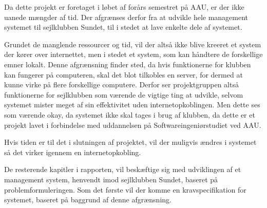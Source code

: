 Da dette projekt er foretaget i løbet af forårs semestret på AAU, er der ikke uanede mængder af tid. Der
afgrænses derfor fra at udvikle hele management systemet til sejlklubben Sundet, til i stedet at lave enkelte
dele af systemet.

Grundet de manglende ressourcer og tid, vil der altså ikke blive kreeret et system der kører over internettet,
men i stedet et system, som kan håndtere de forskellige emner lokalt. Denne afgrænsning finder sted, da hvis
funktionerne for klubben kan fungerer på computeren, skal det blot tilkobles en server, for dermed at kunne
virke på flere forskellige computere. Derfor ser projektgruppen altså funktionerne for sejlklubben som værende
de vigtige ting at udvikle, selvom systemet mister meget af sin effektivitet uden internetopkoblingen. Men
dette ses som værende okay, da systemet ikke skal tages i brug af klubben, da dette er et projekt lavet i
forbindelse med uddannelsen på Softwareingeniørstudiet ved AAU.

Hvis tiden er til det i slutningen af projektet, vil der muligvis ændres i systemet så det virker igennem en
internetopkobling.

De resterende kapitler i rapporten, vil beskæftige sig med udviklingen af et management system, henvendt imod
sejlklubben Sundet, baseret på problemformuleringen. Som det første vil der komme en kravspecifikation for
systemet, baseret på baggrund af denne afgrænsning.
